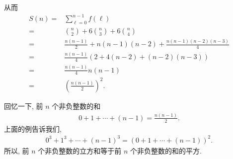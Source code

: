 \begin{example}
    从而
    \begin{align*}
        S(n)
        = {} & \sum_{\ell = 0}^{n - 1} f(\ell)                             \\
        = {} & \binom{n}{2} + 6 \binom{n}{3} + 6 \binom{n}{4}              \\
        = {} & \frac{n(n-1)}{2} + n(n-1)(n-2) + \frac{n(n-1)(n-2)(n-3)}{4} \\
        = {} & \frac{n(n-1)}{4} (2 + 4(n-2) + (n-2)(n-3))                  \\
        = {} & \frac{n(n-1)}{4} n(n-1)                                     \\
        = {} & \left( \frac{n(n-1)}{2} \right)^2.
    \end{align*}
\end{example}

\begin{remark}
    回忆一下, 前 $n$ 个非负整数的和
    \begin{align*}
        0 + 1 + \cdots + (n - 1) = \frac{n(n-1)}{2}.
    \end{align*}
    上面的例告诉我们,
    \begin{align*}
        0^3 + 1^3 + \cdots + (n - 1)^3 = (0 + 1 + \cdots + (n - 1))^2.
    \end{align*}
    所以, 前 $n$ 个非负整数的立方和等于前 $n$ 个非负整数的和的平方.
\end{remark}

